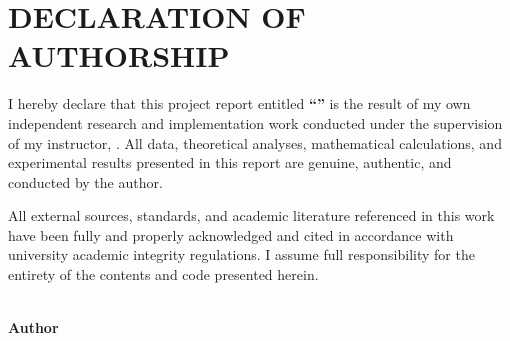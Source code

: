 \chapter*{DECLARATION OF AUTHORSHIP}

I hereby declare that this project report entitled \textbf{``\ProjectTitle''} is the result of my own independent research and implementation work conducted under the supervision of my instructor, \textbf{\InstructorName}. All data, theoretical analyses, mathematical calculations, and experimental results presented in this report are genuine, authentic, and conducted by the author.

All external sources, standards, and academic literature referenced in this work have been fully and properly acknowledged and cited in accordance with university academic integrity regulations. I assume full responsibility for the entirety of the contents and code presented herein.

\vspace{1.5cm}
\begin{flushright}
    \textit{\LocationDate}\\[0.3cm]
    \textbf{Author}\\[2cm]
    \textit{\StudentName}
\end{flushright}
